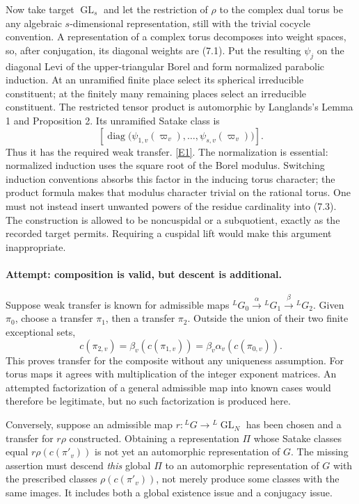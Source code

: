 \documentclass[11pt,a4paper]{article}
\newcommand{\eref}[2]{\hyperlink{extra:#1:#2}{[E#2]}}
\begin{document}
Now take target $\operatorname{GL}_s$ and let the restriction of $\rho$
to the complex dual torus be any algebraic $s$-dimensional representation,
still with the trivial cocycle convention. A representation of a complex
torus decomposes into weight spaces, so, after conjugation, its diagonal
weights are (7.1). Put the resulting $\psi_j$ on the diagonal Levi of
the upper-triangular Borel and form normalized parabolic induction. At
an unramified finite place select its spherical irreducible constituent;
at the finitely many remaining places select an irreducible constituent.
The restricted tensor product is automorphic by Langlands's Lemma 1
and Proposition 2. Its unramified Satake class is
\[
 \left[\operatorname{diag}
  \bigl(\psi_{1,v}(\varpi_v),\ldots,\psi_{s,v}(\varpi_v)\bigr)\right].
 \tag{7.3}
\]
Thus it has the required weak transfer. \eref{30006675}{1}.
The normalization is essential: normalized induction uses the square
root of the Borel modulus. Switching induction conventions absorbs this
factor in the inducing torus character; the product formula makes that
modulus character trivial on the rational torus. One must not instead
insert unwanted powers of the residue cardinality into (7.3).
The construction is allowed to be noncuspidal or a subquotient, exactly
as the recorded target permits. Requiring a cuspidal lift would make
this argument inappropriate.

\paragraph{Attempt: composition is valid, but descent is additional.}
Suppose weak transfer is known for admissible maps
${}^LG_0\xrightarrow{\alpha}{}^LG_1\xrightarrow{\beta}{}^LG_2$.
Given $\pi_0$, choose a transfer $\pi_1$, then a transfer $\pi_2$.
Outside the union of their two finite exceptional sets,
\[
 c(\pi_{2,v})=\beta_v(c(\pi_{1,v}))
             =\beta_v\alpha_v(c(\pi_{0,v})).
 \tag{7.4}
\]
This proves transfer for the composite without any uniqueness assumption.
For torus maps it agrees with multiplication of the integer exponent
matrices. An attempted factorization of a general admissible map into
known cases would therefore be legitimate, but no such factorization is
produced here.

Conversely, suppose an admissible map
$r:{}^LG\to{}^L\operatorname{GL}_N$ has been chosen and a transfer for
$r\rho$ constructed. Obtaining a representation $\Pi$ whose Satake
classes equal $r\rho(c(\pi'_v))$ is not yet an automorphic representation
of $G$. The missing assertion must descend \emph{this} global $\Pi$ to
an automorphic representation of $G$ with the prescribed classes
$\rho(c(\pi'_v))$, not merely produce some classes with the same images.
It includes both a global existence issue and a conjugacy issue.
\end{document}
